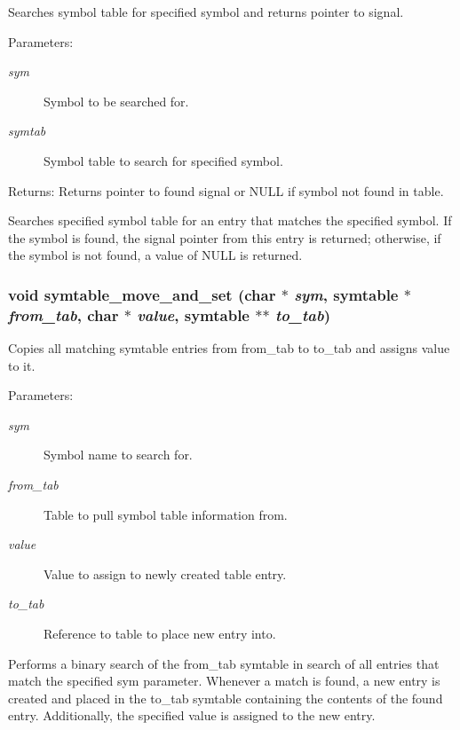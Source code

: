 Searches symbol table for specified symbol and returns pointer to signal. 

\begin{Desc}
\item[Parameters:]
\begin{description}
\item[{\em sym}]Symbol to be searched for. \item[{\em symtab}]Symbol table to search for specified symbol.\end{description}
\end{Desc}
\begin{Desc}
\item[Returns:]Returns pointer to found signal or NULL if symbol not found in table.\end{Desc}
Searches specified symbol table for an entry that matches the specified symbol. If the symbol is found, the signal pointer from this entry is returned; otherwise, if the symbol is not found, a value of NULL is returned. 
\subsubsection{\setlength{\rightskip}{0pt plus 5cm}void symtable\_\-move\_\-and\_\-set (char $\ast$ {\em sym}, {\bf symtable} $\ast$ {\em from\_\-tab}, char $\ast$ {\em value}, {\bf symtable} $\ast$$\ast$ {\em to\_\-tab})}\label{symtable_8h_a3}


Copies all matching symtable entries from from\_\-tab to to\_\-tab and assigns value to it. 

\begin{Desc}
\item[Parameters:]
\begin{description}
\item[{\em sym}]Symbol name to search for. \item[{\em from\_\-tab}]Table to pull symbol table information from. \item[{\em value}]Value to assign to newly created table entry. \item[{\em to\_\-tab}]Reference to table to place new entry into.\end{description}
\end{Desc}
Performs a binary search of the from\_\-tab symtable in search of all entries that match the specified sym parameter. Whenever a match is found, a new entry is created and placed in the to\_\-tab symtable containing the contents of the found entry. Additionally, the specified value is assigned to the new entry. 